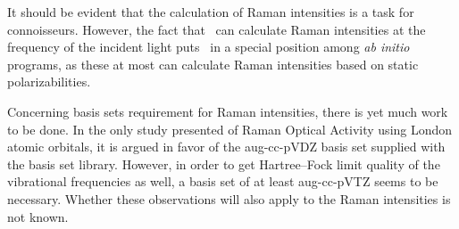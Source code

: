 It should be evident that the calculation of Raman intensities is
a task for connoisseurs. However, the fact that \siraba\ can
calculate Raman intensities at the frequency of the incident
light puts \siraba\ in a special position among {\em ab initio}
programs, as these  at most  can calculate Raman intensities
based on static polarizabilities.

Concerning basis sets requirement for Raman intensities,  there is
yet much work to be done. In the only study presented of Raman
Optical Activity using London atomic orbitals, it is argued in
favor of the aug-cc-pVDZ basis set supplied with the basis set
library. However, in order to get Hartree--Fock limit quality of
the vibrational frequencies as well, a basis set of at least
aug-cc-pVTZ seems to be necessary. Whether these observations will
also apply to the Raman intensities is not known.
